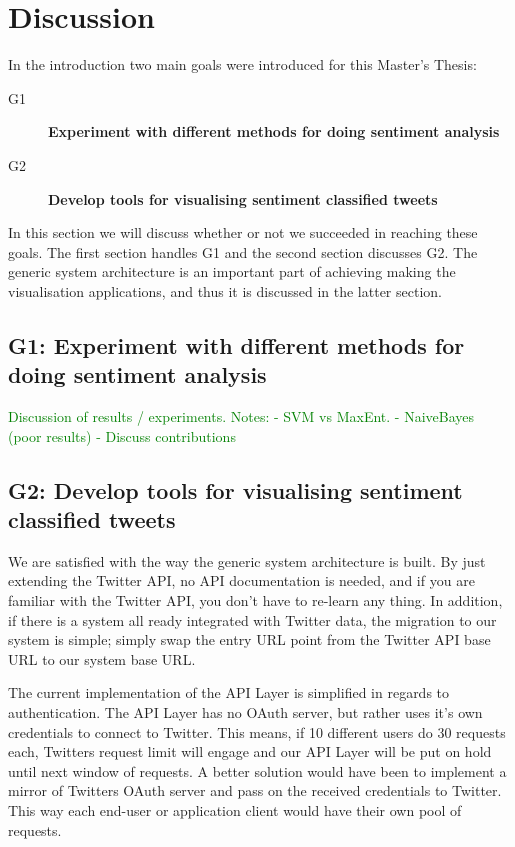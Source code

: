 \chapter{Discussion}

In the introduction two main goals were introduced for this Master's Thesis:

\begin{description}

\item[G1] \textbf{Experiment with different methods for doing sentiment analysis}
	
\item[G2] \textbf{Develop tools for visualising sentiment classified tweets}

\end{description}

In this section we will discuss whether or not we succeeded in reaching these goals. The first section handles G1 and the second section discusses G2. The generic system architecture is an important part of achieving making the visualisation applications, and thus it is discussed in the latter section.

\section{G1: Experiment with different methods for doing sentiment analysis}

\textcolor{green}{
	Discussion of results / experiments.
	Notes: 
		- SVM vs MaxEnt.
		- NaiveBayes (poor results)
		- Discuss contributions
}

\section{G2: Develop tools for visualising sentiment classified tweets}

We are satisfied with the way the generic system architecture is built. By just extending the Twitter API, no API documentation is needed, and if you are familiar with the Twitter API, you don't have to re-learn any thing. In addition, if there is a system all ready integrated with Twitter data, the migration to our system is simple; simply swap the entry URL point from the Twitter API base URL to our system base URL. 

The current implementation of the API Layer is simplified in regards to authentication. The API Layer has no OAuth server, but rather uses it's own credentials to connect to Twitter. This means, if 10 different users do 30 requests each, Twitters request limit will engage and our API Layer will be put on hold until next window of requests. A better solution would have been to implement a mirror of Twitters OAuth server and pass on the received credentials to Twitter. This way each end-user or application client would have their own pool of requests. 

